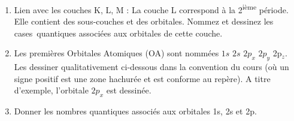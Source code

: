 \begin{enumerate}[\bf 1)]
\item Lien avec les couches K, L, M : La couche L correspond \`a la 2\textsuperscript{i\`eme} p\'eriode. Elle contient des
sous-couches et des orbitales. Nommez et dessinez les cases~quantiques associ\'ees aux orbitales de cette couche.
\item Les premi\`eres Orbitales Atomiques (OA) sont nomm\'ees $1s$ $2s$ $2p_x$ $2p_y$
2p$_z$. Les dessiner qualitativement ci-dessous dans la convention du cours (o\`u un signe positif est une
zone hachur\'ee et est conforme au rep\`ere). A titre d'exemple, l'orbitale $2p_x$ est dessin\'ee.
\item Donner les nombres quantiques associés aux orbitales 1s, 2s et 2p.
\end{enumerate}
%
\begin{center}
\end{center}
